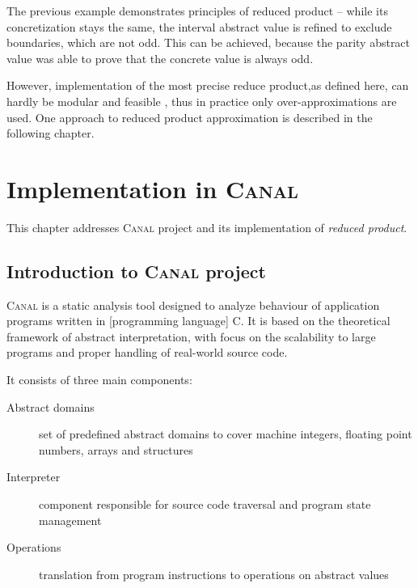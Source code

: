 \documentclass[12pt,oneside]{fithesis2}
\theoremstyle{definition}
\begin{document}
The previous example demonstrates principles of reduced product -- while its concretization stays the same, the interval abstract value is refined to exclude boundaries, which are not odd. This can be achieved, because the parity abstract value was able to prove that the concrete value is always odd.

However, implementation of the most precise reduce product,as defined here, can hardly be modular and feasible \cite{CousotCousotMauborgne-FoSSaCS-11}, thus in practice only over-approximations are used. One approach to reduced product approximation is described in the following chapter.

\chapter{Implementation in \textsc{Canal}}\label{ch:implementation}

This chapter addresses \textsc{Canal} project and its implementation of \textit{reduced product}.

\section{Introduction to \textsc{Canal} project}

\textsc{Canal} is a static analysis tool designed to analyze behaviour of
application programs written in [programming language] C. It is based on the theoretical
framework of abstract interpretation, with focus on the scalability to
large programs and proper handling of real-world source code. \cite{Canal}

It consists of three main components:

\begin{description}
  \item[Abstract domains] set of predefined abstract domains to cover machine integers, floating point numbers, arrays and structures
  \item[Interpreter] component responsible for source code traversal and program state management
  \item[Operations] translation from program instructions to operations on abstract values
\end{description}
\end{document}
